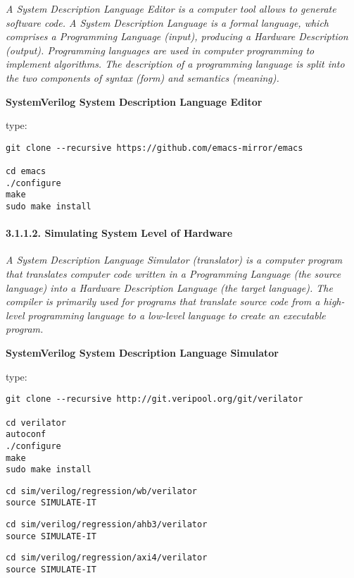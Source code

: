 \documentclass[]{article}
\let\oldparagraph\paragraph
\renewcommand{\paragraph}[1]{\oldparagraph{#1}\mbox{}}
\begin{document}
\emph{A System Description Language Editor is a computer tool allows to
generate software code. A System Description Language is a formal
language, which comprises a Programming Language (input), producing a
Hardware Description (output). Programming languages are used in
computer programming to implement algorithms. The description of a
programming language is split into the two components of syntax (form)
and semantics (meaning).}

\textbf{SystemVerilog System Description Language Editor}

type:

\begin{verbatim}
git clone --recursive https://github.com/emacs-mirror/emacs

cd emacs
./configure
make
sudo make install
\end{verbatim}

\paragraph{3.1.1.2. Simulating System Level of
Hardware}\label{simulating-system-level-of-hardware}

\emph{A System Description Language Simulator (translator) is a computer
program that translates computer code written in a Programming Language
(the source language) into a Hardware Description Language (the target
language). The compiler is primarily used for programs that translate
source code from a high-level programming language to a low-level
language to create an executable program.}

\textbf{SystemVerilog System Description Language Simulator}

type:

\begin{verbatim}
git clone --recursive http://git.veripool.org/git/verilator

cd verilator
autoconf
./configure
make
sudo make install
\end{verbatim}

\begin{verbatim}
cd sim/verilog/regression/wb/verilator
source SIMULATE-IT
\end{verbatim}

\begin{verbatim}
cd sim/verilog/regression/ahb3/verilator
source SIMULATE-IT
\end{verbatim}

\begin{verbatim}
cd sim/verilog/regression/axi4/verilator
source SIMULATE-IT
\end{verbatim}
\end{document}
